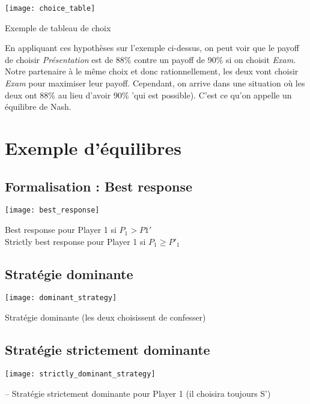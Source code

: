 \begin{table}[H]
    \centering
    \texttt{[image: choice\_table]}
    \caption{Exemple de tableau de choix}
\end{table}

En appliquant ces hypothèses sur l'exemple ci-dessus, on peut voir que le payoff de choisir \textit{Présentation} est de 88\% contre un payoff de 90\% si on choisit \textit{Exam}. Notre partenaire à le même choix et donc rationnellement, les deux vont choisir \textit{Exam} pour maximiser leur payoff. Cependant, on arrive dans une situation où les deux ont 88\% au lieu d'avoir 90\% 'qui est possible). C'est ce qu'on appelle un équilibre de Nash.

\section{Exemple d'équilibres}

\subsection{Formalisation : Best response}

\begin{table}[H]
    \centering
    \texttt{[image: best\_response]}
    \caption{Best response pour Player 1 si $P_1 > P1'$\\Strictly best response pour Player 1 si $P_1 \geq P'_1$}
\end{table}


\subsection{Stratégie dominante}

\begin{table}[H]
    \centering
    \texttt{[image: dominant\_strategy]}
    \caption{Stratégie dominante (les deux choisissent de confesser)}
\end{table}

\subsection{Stratégie strictement dominante}

\begin{table}[H]
    \centering
    \texttt{[image: strictly\_dominant\_strategy]}
    \caption{– Stratégie strictement dominante pour Player 1 (il choisira toujours S’)}
\end{table}

